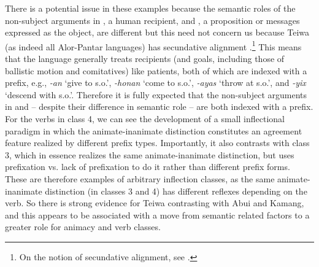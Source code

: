 There is a potential issue in these examples because the semantic roles of the non-subject arguments in , a human recipient, and , a proposition or messages expressed as the object, are different but this need not concern us because Teiwa (as indeed all Alor-Pantar languages) has secundative alignment \citep[449, 454]{Klamer2010ditransitive}.\footnote{On the notion of secundative alignment,  see \citet{Dryer1986}.} This means that the language generally treats recipients (and goals, including those of ballistic motion and comitatives) like patients, both of which are indexed with a prefix, e.g., \textit{-an} `give to s.o.', \textit{-honan} `come to s.o.', \textit{-ayas} `throw at s.o.', and \textit{-yix} `descend with s.o.'. Therefore it is fully expected that the non-subject arguments in  and  -- despite their difference in semantic role -- are both indexed with a prefix. For the verbs in class 4, we can see the development of a small inflectional paradigm in which the animate-inanimate distinction constitutes an agreement feature realized by different prefix types. Importantly, it also contrasts with class 3, which in essence realizes the same animate-inanimate distinction, but uses prefixation vs. lack of prefixation to do it rather than different prefix forms. These are therefore examples of arbitrary inflection classes, as the same animate-inanimate distinction (in classes 3 and 4) has different reflexes depending on the verb. So there is strong evidence for Teiwa contrasting with Abui and Kamang, and this appears to be associated with a move from semantic related factors to a greater role for animacy and verb classes. 

